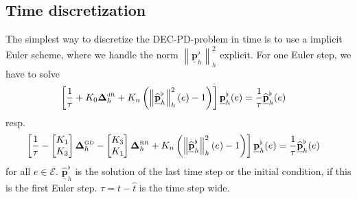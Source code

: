 \documentclass[a4paper,11pt]{scrartcl}
\newcommand{\PDpflh}{\underline{\mathbf{p}}^{\flat}_{h}}
\newcommand{\PDpflhOld}{\underline{\widehat{\mathbf{p}}}^{\flat}_{h}}
\newcommand{\LB}{\boldsymbol{\Delta}^{\text{\tiny RR}}}
\newcommand{\LCB}{\boldsymbol{\Delta}^{\text{\tiny GD}}}
\newcommand{\LDR}{\boldsymbol{\Delta}^{\text{\tiny dR}}}
\newcommand{\LBh}{\LB_{h}}
\newcommand{\LCBh}{\LCB_{h}}
\newcommand{\LDRh}{\LDR_{h}}
\newcommand{\E}{\mathcal{E}}
\begin{document}
  \subsection{Time discretization}
    The simplest way to discretize the DEC-PD-problem in time is to use a implicit Euler scheme, 
    where we handle the norm \( \left\| \PDpflh \right\|_{h}^{2} \) explicit.
    For one Euler step, we have to solve
    \begin{align}
      \left[ \frac{1}{\tau} + K_{0}\LDRh + K_{n}\left( \left\| \PDpflhOld \right\|_{h}^{2}(e) - 1 \right) \right]\PDpflh(e) 
          &= \frac{1}{\tau} \PDpflhOld(e)
    \end{align}
    resp.
    \begin{align}
       \left[  \frac{1}{\tau}-   
            \begin{bmatrix}
               K_{1} \\ K_{3}
            \end{bmatrix} \LCBh
            -\begin{bmatrix}
               K_{3} \\ K_{1}
            \end{bmatrix} \LBh
    + K_{n}\left( \left\| \PDpflhOld \right\|_{h}^{2}(e) - 1 \right) \right]\PDpflh(e) 
          &= \frac{1}{\tau} \PDpflhOld(e)
    \end{align}
    for all \( e\in\E \).
    \( \PDpflhOld  \) is the solution of the last time step or the initial condition, if this is the first Euler step.
    \( \tau = t - \hat{t}  \) is the time step wide.
    
\end{document}
